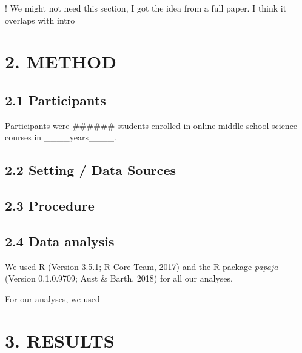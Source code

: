 \documentclass[]{apa6}
\theoremstyle{definition}
\theoremstyle{definition}
\theoremstyle{definition}
\theoremstyle{remark}
\begin{document}
! We might not need this section, I got the idea from a full paper. I
think it overlaps with intro

\section{2. METHOD}\label{method}

\subsection{2.1 Participants}\label{participants}

Participants were \#\#\#\#\#\# students enrolled in online middle school
science courses in \_\_\_\_years\_\_\_\_.

\subsection{2.2 Setting / Data Sources}\label{setting-data-sources}

\subsection{2.3 Procedure}\label{procedure}

\subsection{2.4 Data analysis}\label{data-analysis}

We used R (Version 3.5.1; R Core Team, 2017) and the R-package
\emph{papaja} (Version 0.1.0.9709; Aust \& Barth, 2018) for all our
analyses.

For our analyses, we used

\section{3. RESULTS}\label{results}
\end{document}
